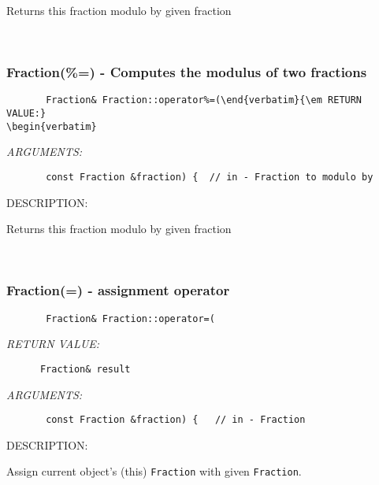       Returns this fraction modulo by given fraction
   
 
\mbox{}\hrulefill\ 
 
\subsubsection [Fraction(\%=)] {Fraction(\%=) - Computes the modulus of two fractions}


  
\begin{verbatim}       Fraction& Fraction::operator%=(\end{verbatim}{\em RETURN VALUE:}
\begin{verbatim} \end{verbatim}{\em ARGUMENTS:}
\begin{verbatim}       const Fraction &fraction) {  // in - Fraction to modulo by\end{verbatim}
{\sf DESCRIPTION:\\ }


      Returns this fraction modulo by given fraction
   
 
\mbox{}\hrulefill\ 
 
\subsubsection [Fraction(=)] {Fraction(=) - assignment operator}


  
\begin{verbatim}       Fraction& Fraction::operator=(\end{verbatim}{\em RETURN VALUE:}
\begin{verbatim}      Fraction& result\end{verbatim}{\em ARGUMENTS:}
\begin{verbatim}       const Fraction &fraction) {   // in - Fraction\end{verbatim}
{\sf DESCRIPTION:\\ }


        Assign current object's (this) {\tt Fraction} with given
        {\tt Fraction}.   
 
\mbox{}\hrulefill\ 
 
